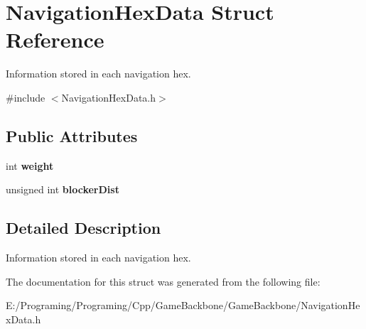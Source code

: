 \hypertarget{struct_navigation_hex_data}{}\section{Navigation\+Hex\+Data Struct Reference}
\label{struct_navigation_hex_data}


Information stored in each navigation hex.  




{\ttfamily \#include $<$Navigation\+Hex\+Data.\+h$>$}

\subsection*{Public Attributes}
\begin{DoxyCompactItemize}
\item 
\mbox{\label{struct_navigation_hex_data_aa04d0d93b848701da777f0e03920d51f}} 
int {\bfseries weight}
\item 
\mbox{\label{struct_navigation_hex_data_a608ab4b8190230320ae175625ab9e756}} 
unsigned int {\bfseries blocker\+Dist}
\end{DoxyCompactItemize}


\subsection{Detailed Description}
Information stored in each navigation hex. 



The documentation for this struct was generated from the following file\+:\begin{DoxyCompactItemize}
\item 
E\+:/\+Programing/\+Programing/\+Cpp/\+Game\+Backbone/\+Game\+Backbone/Navigation\+Hex\+Data.\+h\end{DoxyCompactItemize}
